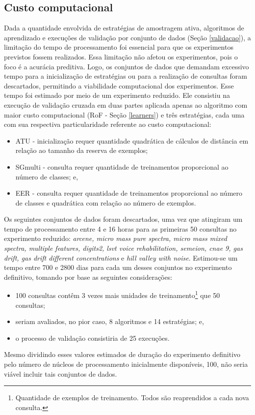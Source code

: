 \subsection{Custo computacional}\label{sectempo}
Dada a quantidade envolvida de estratégias de amostragem ativa, algoritmos de aprendizado e execuções de validação por conjunto de dados (Seção \ref{validacao}), a limitação do tempo de processamento foi essencial para que os experimentos previstos fossem realizados.
Essa limitação não afetou os experimentos, pois o foco é a acurácia preditiva.
Logo, os conjuntos de dados que demandam excessivo tempo para a inicialização de estratégias ou para a realização de consultas foram descartados, permitindo a viabilidade computacional dos experimentos.
Esse tempo foi estimado por meio de um experimento reduzido.
Ele consistiu na execução de validação cruzada em duas partes aplicada apenas ao algoritmo com maior custo computacional (RoF - Seção \ref{learners}) e três estratégias, cada uma com sua respectiva particularidade referente ao custo computacional:
\begin{itemize}
   \item ATU - inicialização requer quantidade quadrática de cálculos de distância em relação ao tamanho da reserva de exemplos;
   \item SGmulti - consulta requer quantidade de treinamentos proporcional ao número de classes; e,
   \item EER - consulta requer quantidade de treinamentos proporcional ao número de classes e quadrática com relação ao número de exemplos.
\end{itemize}
Os seguintes conjuntos de dados foram descartados, uma vez que atingiram um tempo de processamento entre 4 e 16 horas para as primeiras 50 consultas no experimento reduzido:
\textit{arcene, micro mass pure spectra, micro mass mixed spectra, multiple features, digits2, lsvt voice rehabilitation, semeion, cnae 9, gas drift, gas drift different concentrations} e \textit{hill valley with noise}.
Estimou-se um tempo entre 700 e 2800 dias para cada um desses conjuntos no experimento definitivo, tomando por base as seguintes considerações:
\begin{itemize}
   \item 100 consultas contêm 3 vezes mais unidades de treinamento\footnote{Quantidade de exemplos de treinamento. Todos são reaprendidos a cada nova consulta.} que 50 consultas;
   \item seriam avaliados, no pior caso, 8 algoritmos e 14 estratégias; e,
   \item o processo de validação consistiria de 25 execuções.
\end{itemize}
Mesmo dividindo esses valores estimados de duração do experimento definitivo pelo número de núcleos de processamento inicialmente disponíveis, 100, não seria viável incluir tais conjuntos de dados.

